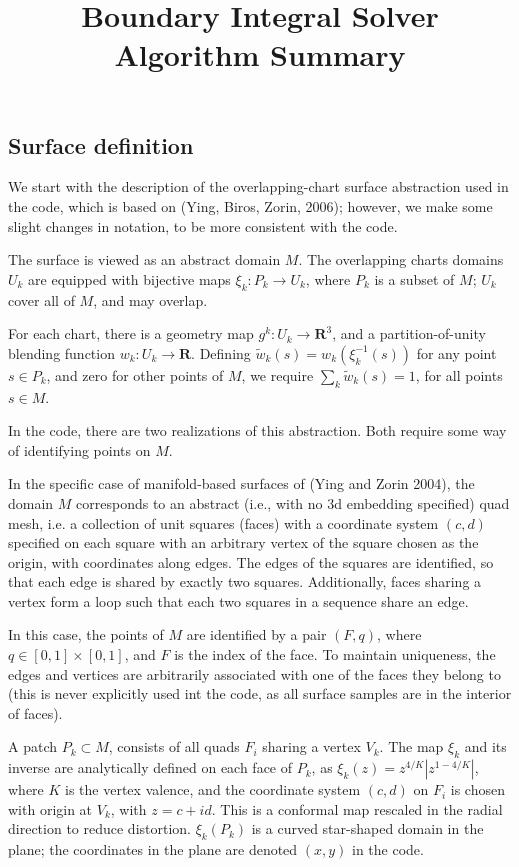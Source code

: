 \documentclass[10pt]{article}
\title{Boundary Integral Solver Algorithm Summary}
\begin{document}
\maketitle

\subsection*{Surface definition}
We start with the description of the overlapping-chart surface
abstraction used in the code, which is based on (Ying, Biros, Zorin, 2006);
however, we make some slight changes in notation, to be more consistent with the code.

The surface is viewed as an abstract domain $M$.
The overlapping charts domains $U_k$  are
equipped with bijective maps $\xi_k: P_k \rightarrow U_k$, where
$P_k$ is a subset of $M$; $U_k$ cover all of $M$, and may overlap.

			    For each chart, there is a geometry map
$g^k: U_k \rightarrow \mathbf{R}^3$, and a partition-of-unity blending
function $w_k: U_k \rightarrow \mathbf{R}$. Defining
$\tilde{w}_k(s) = w_k(\xi^{-1}_k(s))$ for any point $s \in P_k$, and zero for other
points of $M$, we require $\sum_k \tilde{w}_k(s) = 1$, for all points
$s \in M$.

In the code, there are two realizations of this abstraction. 
Both require some way of identifying points on $M$.

In the specific case of manifold-based surfaces of (Ying and Zorin
2004), the domain $M$ corresponds to an abstract (i.e., with no 3d
embedding specified) quad mesh, i.e. a collection of unit squares (faces) with
a coordinate system $(c,d)$  specified on each square with an
arbitrary vertex of the square chosen as the origin, with coordinates
along edges. The edges of the squares are identified, so that each edge is shared by exactly two
squares. Additionally, faces sharing a vertex form a loop such that
each two squares in a sequence share an edge.

In this case, the points of $M$  are identified by a pair $(F,q)$,
where $q\in [0,1] \times [0,1]$, and $F$ is the index of the face.
To maintain uniqueness,  the edges and vertices are arbitrarily associated with one of
the faces they belong to (this is never explicitly used int the code,
as all surface samples are in the interior of faces).

A patch $P_k \subset M$, consists of all quads $F_i$  sharing a vertex
$V_k$. The map $\xi_k$ and its inverse are analytically defined on
each face of $P_k$, as $\xi_k(z) = z^{4/K}|z^{1-4/K}|$, where $K$ is the vertex
valence, and the  coordinate system $(c,d)$  on $F_i$ is chosen with origin at
$V_k$,  with $z = c +id$. This is a conformal map rescaled in the radial direction to reduce
distortion.  $\xi_k(P_k)$ is a curved star-shaped domain in the
plane; the coordinates in the plane are denoted $(x,y)$ in the code. 
\end{document}
